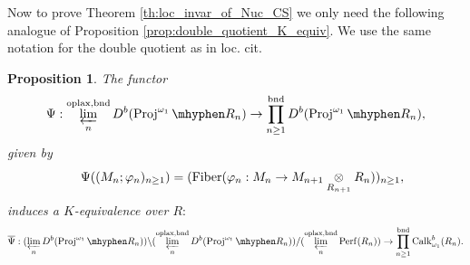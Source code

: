 \documentclass[11pt,leqno]{amsart}
\newtheorem{prop}[theo]{Proposition}
\numberwithin{equation}{section}
\newcommand{\tens}[1]{%
  \mathbin{\mathop{\otimes}\displaylimits_{#1}}%
}
\newcommand{\hy}{\mhyphen}
\newcommand{\prolim}[1][]{\mathop{\varprojlim}\limits_{#1}}
\newcommand{\prodd}[1][]{\mathop{\prod}\limits_{#1}}
\newcommand{\bbar}{\overline}
\newcommand{\bnd}{\operatorname{bnd}}
\newcommand{\oplax}{\operatorname{oplax}}
\newcommand{\Proj}{\operatorname{Proj}}
\newcommand{\Fiber}{\operatorname{Fiber}}
\newcommand{\Perf}{\operatorname{Perf}}
\newcommand{\Calk}{\operatorname{Calk}}
\begin{document}
Now to prove Theorem \ref{th:loc_invar_of_Nuc_CS} we only need the following analogue of Proposition \ref{prop:double_quotient_K_equiv}. We use the same notation for the double quotient as in loc. cit.

\begin{prop}\label{prop:double_quotient_K_equiv_bounded}
The functor
\begin{equation*}
\Psi:\prolim[n]^{\oplax,\bnd}D^b(\Proj^{\omega_1}\hy R_n)\to \prodd[n\geq 1]^{\bnd}D^b(\Proj^{\omega_1}\hy R_n),
\end{equation*}
given by
\begin{equation*}
\quad \Psi((M_n;\varphi_n)_{n\geq 1}) = (\Fiber(\varphi_n:M_n\to M_{n+1}\tens{R_{n+1}}R_n))_{n\geq 1},
\end{equation*}
induces a $K$-equivalence over $R:$
\begin{equation*}
\bbar{\Psi}:(\prolim[n] D^b(\Proj^{\omega_1}\hy R_n))\backslash (\prolim[n]^{\oplax,\bnd}D^b(\Proj^{\omega_1}\hy R_n))/(\prolim[n]^{\oplax,\bnd}\Perf(R_n))\to \prodd[n\geq 1]^{\bnd}\Calk_{\omega_1}^b(R_n).
\end{equation*}
\end{prop}
\end{document}
